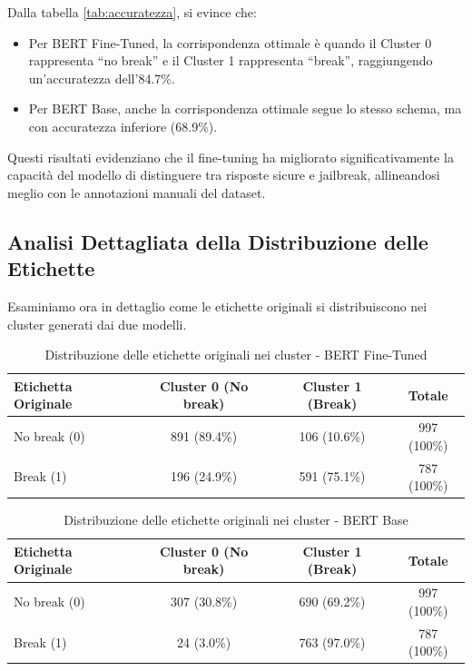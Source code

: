 \documentclass[a4paper,12pt]{article}
\begin{document}
Dalla tabella \ref{tab:accuratezza}, si evince che:
\begin{itemize}
  \item Per BERT Fine-Tuned, la corrispondenza ottimale è quando il Cluster 0 rappresenta ``no break'' e il Cluster 1 rappresenta ``break'', raggiungendo un'accuratezza dell'84.7\%.
  \item Per BERT Base, anche la corrispondenza ottimale segue lo stesso schema, ma con accuratezza inferiore (68.9\%).
\end{itemize}

Questi risultati evidenziano che il fine-tuning ha migliorato significativamente la capacità del modello di distinguere tra risposte sicure e jailbreak, allineandosi meglio con le annotazioni manuali del dataset.
\subsection{Analisi Dettagliata della Distribuzione delle Etichette}
Esaminiamo ora in dettaglio come le etichette originali si distribuiscono nei cluster generati dai due modelli.

\begin{table}[htbp]
  \centering
  \caption{Distribuzione delle etichette originali nei cluster - BERT Fine-Tuned}
  \label{tab:distribuzione_dettagliata_fine_tuned}
  \begin{tabular}{lcc|c}
    \hline
    \textbf{Etichetta Originale} & \textbf{Cluster 0 (No break)} & \textbf{Cluster 1 (Break)} & \textbf{Totale} \\
    \hline
    No break (0) & 891 (89.4\%) & 106 (10.6\%) & 997 (100\%) \\
    Break (1) & 196 (24.9\%) & 591 (75.1\%) & 787 (100\%) \\
    \hline
  \end{tabular}
\end{table}

\begin{table}[htbp]
  \centering
  \caption{Distribuzione delle etichette originali nei cluster - BERT Base}
  \label{tab:distribuzione_dettagliata_base}
  \begin{tabular}{lcc|c}
    \hline
    \textbf{Etichetta Originale} & \textbf{Cluster 0 (No break)} & \textbf{Cluster 1 (Break)} & \textbf{Totale} \\
    \hline
    No break (0) & 307 (30.8\%) & 690 (69.2\%) & 997 (100\%) \\
    Break (1) & 24 (3.0\%) & 763 (97.0\%) & 787 (100\%) \\
    \hline
  \end{tabular}
\end{table}
\end{document}
